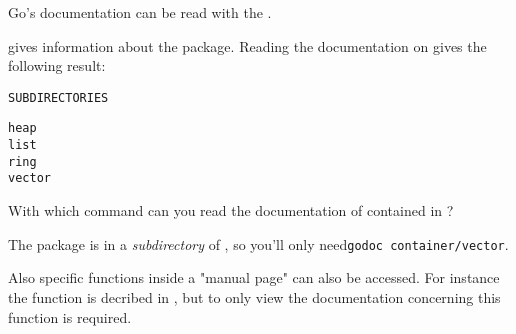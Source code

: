 \begin{Exercise}[title={Documentation},difficulty=1]
\label{ex:doc}
\Question
Go's documentation can be read with the . 

 gives information about the  package. Reading the
documentation on  gives the following result:
\begin{alltt}
SUBDIRECTORIES

heap
list
ring
vector
\end{alltt}

With which  command can you read the documentation of  contained in
?

\end{Exercise}

\begin{Answer}
\Question
The package  is in a \emph{subdirectory} of
, so you'll only need\quad \texttt{godoc
container/vector}.

Also specific functions inside a "manual page" can also be accessed. For
instance the function  is decribed in , but to
only view the documentation concerning this function  is required.
\end{Answer}
